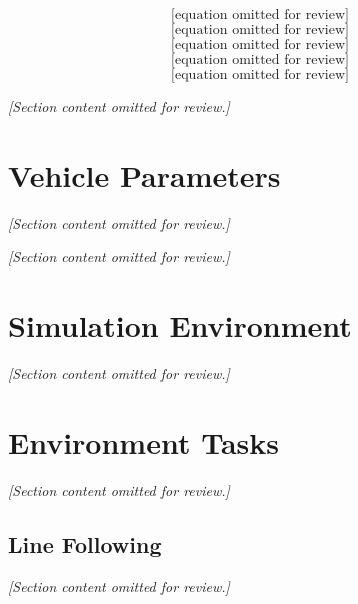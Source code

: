 \begin{equation}
\text{[equation omitted for review]}
\label{eq:hitch_point}
\end{equation}
\begin{equation}
\text{[equation omitted for review]}
\label{eq:trailer_yaw}
\end{equation}
\begin{equation}
\text{[equation omitted for review]}
\label{eq:hitch_kinematics}
\end{equation}
\begin{equation}
\text{[equation omitted for review]}
\label{eq:trailer_axle}
\end{equation}
\begin{equation}
\text{[equation omitted for review]}
\label{eq:hitch_eig}
\end{equation}

\textit{[Section content omitted for review.]}

\section{Vehicle Parameters}
\label{sec:vehicle_params}

\textit{[Section content omitted for review.]}

\begin{table}[H]
\centering
\caption{Vehicle parameters used in simulation, for the bobtail Kalmar Ottawa T2 diesel terminal tractor.}
\label{tab:vehicle_params}
\end{table}

\textit{[Section content omitted for review.]}

\section{Simulation Environment}
\label{ch:simulation}

\textit{[Section content omitted for review.]}

\section{Environment Tasks}
\textit{[Section content omitted for review.]}

\subsection{Line Following}
\textit{[Section content omitted for review.]}

